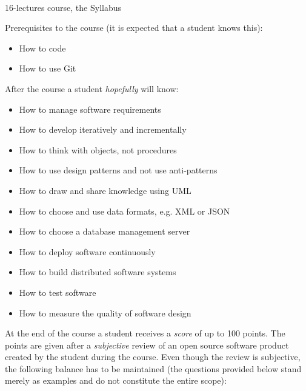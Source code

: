 \documentclass[nobrand,anonymous,nodate,nosecurity]{huawei}
\begin{document}
{\\
16-lectures course, the Syllabus}

Prerequisites to the course (it is expected that a student knows this):

\begin{itemize}
\item How to code
\item How to use Git
\end{itemize}

After the course a student \emph{hopefully} will know:

\begin{itemize}
\item How to manage software requirements
\item How to develop iteratively and incrementally
\item How to think with objects, not procedures
\item How to use design patterns and not use anti-patterns
\item How to draw and share knowledge using UML
\item How to choose and use data formats, e.g. XML or JSON
\item How to choose a database management server
\item How to deploy software continuously
\item How to build distributed software systems
\item How to test software
\item How to measure the quality of software design
\end{itemize}

At the end of the course a student receives a \emph{score} of up
to 100 points. The points are given after a \emph{subjective} review
of an open source software product created by the student during the
course. Even though the review is subjective, the following
balance has to be maintained (the questions provided below
stand merely as examples and do not constitute the entire scope):
\end{document}
